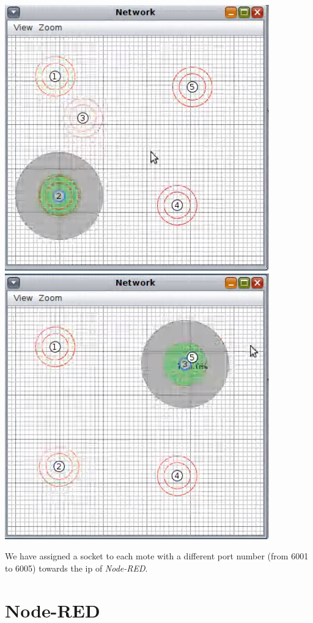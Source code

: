 \documentclass{article}
\begin{document}
\begin{center}
\includegraphics[scale=1]{img9.png}
\includegraphics[scale=1]{img10.png}
\end{center}
We have assigned a socket to each mote with a different port number (from 6001 to 6005) towards the ip of \textit{Node-RED}.


\section{Node-RED}
\end{document}
